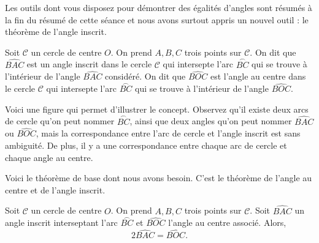 Les outils dont vous disposez pour démontrer des égalités d'angles sont résumés à la fin du résumé de cette séance et nous avons surtout appris un nouvel outil : le théorème de l'angle inscrit.


\begin{dfn}
Soit $\mathcal{C}$ un cercle de centre $O$. On prend $A,B,C$ trois points sur $\mathcal{C}$. On dit que $\widehat{BAC}$ est un angle inscrit dans le cercle $\mathcal{C}$ qui intersepte l'arc $\stackrel \frown{BC}$ qui se trouve à l'intérieur de l'angle $\widehat{BAC}$ considéré. On dit que $\widehat{BOC}$ est l'angle au centre dans le cercle $\mathcal{C}$ qui intersepte l'arc $\stackrel \frown{BC}$ qui se trouve à l'intérieur de l'angle $\widehat{BOC}$.
\end{dfn}

Voici une figure qui permet d'illustrer le concept. Observez qu'il existe deux arcs de cercle qu'on peut nommer $\stackrel \frown{BC}$, ainsi que deux angles qu'on peut nommer $\widehat{BAC}$ ou $\widehat{BOC}$, mais la correspondance entre l'arc de cercle et l'angle inscrit est sans ambiguité. De plus, il y a une correspondance entre chaque arc de cercle et chaque angle au centre.
\newline

Voici le théorème de base dont nous avons besoin. C'est le théorème de l'angle au centre et de l'angle inscrit.

\begin{thm}
Soit $\mathcal{C}$ un cercle de centre $O$. On prend $A,B,C$ trois points sur $\mathcal{C}$. Soit $\widehat{BAC}$ un angle inscrit interseptant l'arc $\stackrel \frown{BC}$ et $\widehat{BOC}$ l'angle au centre associé. Alors,
\[
2\widehat{BAC}=\widehat{BOC}.
\]
\end{thm}

